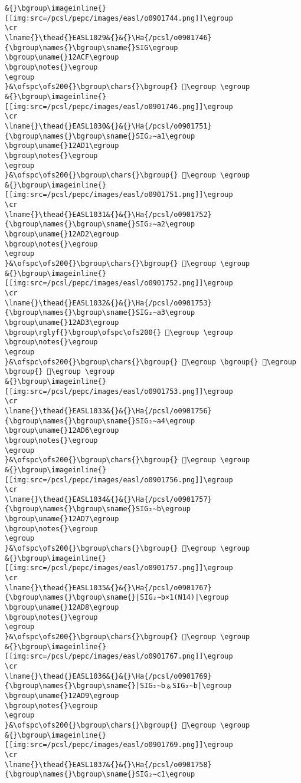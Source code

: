 \begin{verbatim}
&{}\bgroup\imageinline{}[[img:src=/pcsl/pepc/images/easl/o0901744.png]]\egroup
\cr
\lname{}\thead{}EASL1029&{}&{}\Ha{/pcsl/o0901746}{\bgroup\names{}\bgroup\sname{}SIG\egroup
\bgroup\uname{}12ACF\egroup
\bgroup\notes{}\egroup
\egroup
}&\ofspc\ofs200{}\bgroup\chars{}\bgroup{} 𒫏\egroup \egroup
&{}\bgroup\imageinline{}[[img:src=/pcsl/pepc/images/easl/o0901746.png]]\egroup
\cr
\lname{}\thead{}EASL1030&{}&{}\Ha{/pcsl/o0901751}{\bgroup\names{}\bgroup\sname{}SIG₂∼a1\egroup
\bgroup\uname{}12AD1\egroup
\bgroup\notes{}\egroup
\egroup
}&\ofspc\ofs200{}\bgroup\chars{}\bgroup{} 𒫑\egroup \egroup
&{}\bgroup\imageinline{}[[img:src=/pcsl/pepc/images/easl/o0901751.png]]\egroup
\cr
\lname{}\thead{}EASL1031&{}&{}\Ha{/pcsl/o0901752}{\bgroup\names{}\bgroup\sname{}SIG₂∼a2\egroup
\bgroup\uname{}12AD2\egroup
\bgroup\notes{}\egroup
\egroup
}&\ofspc\ofs200{}\bgroup\chars{}\bgroup{} 𒫒\egroup \egroup
&{}\bgroup\imageinline{}[[img:src=/pcsl/pepc/images/easl/o0901752.png]]\egroup
\cr
\lname{}\thead{}EASL1032&{}&{}\Ha{/pcsl/o0901753}{\bgroup\names{}\bgroup\sname{}SIG₂∼a3\egroup
\bgroup\uname{}12AD3\egroup
\bgroup\rglyf{}\bgroup\ofspc\ofs200{} 𒫓\egroup \egroup
\bgroup\notes{}\egroup
\egroup
}&\ofspc\ofs200{}\bgroup\chars{}\bgroup{} 𒫓\egroup \bgroup{} 𒫔\egroup \bgroup{} 𒫕\egroup \egroup
&{}\bgroup\imageinline{}[[img:src=/pcsl/pepc/images/easl/o0901753.png]]\egroup
\cr
\lname{}\thead{}EASL1033&{}&{}\Ha{/pcsl/o0901756}{\bgroup\names{}\bgroup\sname{}SIG₂∼a4\egroup
\bgroup\uname{}12AD6\egroup
\bgroup\notes{}\egroup
\egroup
}&\ofspc\ofs200{}\bgroup\chars{}\bgroup{} 𒫖\egroup \egroup
&{}\bgroup\imageinline{}[[img:src=/pcsl/pepc/images/easl/o0901756.png]]\egroup
\cr
\lname{}\thead{}EASL1034&{}&{}\Ha{/pcsl/o0901757}{\bgroup\names{}\bgroup\sname{}SIG₂∼b\egroup
\bgroup\uname{}12AD7\egroup
\bgroup\notes{}\egroup
\egroup
}&\ofspc\ofs200{}\bgroup\chars{}\bgroup{} 𒫗\egroup \egroup
&{}\bgroup\imageinline{}[[img:src=/pcsl/pepc/images/easl/o0901757.png]]\egroup
\cr
\lname{}\thead{}EASL1035&{}&{}\Ha{/pcsl/o0901767}{\bgroup\names{}\bgroup\sname{}|SIG₂∼b×1(N14)|\egroup
\bgroup\uname{}12AD8\egroup
\bgroup\notes{}\egroup
\egroup
}&\ofspc\ofs200{}\bgroup\chars{}\bgroup{} 𒫘\egroup \egroup
&{}\bgroup\imageinline{}[[img:src=/pcsl/pepc/images/easl/o0901767.png]]\egroup
\cr
\lname{}\thead{}EASL1036&{}&{}\Ha{/pcsl/o0901769}{\bgroup\names{}\bgroup\sname{}|SIG₂∼b﹠SIG₂∼b|\egroup
\bgroup\uname{}12AD9\egroup
\bgroup\notes{}\egroup
\egroup
}&\ofspc\ofs200{}\bgroup\chars{}\bgroup{} 𒫙\egroup \egroup
&{}\bgroup\imageinline{}[[img:src=/pcsl/pepc/images/easl/o0901769.png]]\egroup
\cr
\lname{}\thead{}EASL1037&{}&{}\Ha{/pcsl/o0901758}{\bgroup\names{}\bgroup\sname{}SIG₂∼c1\egroup

\end{verbatim}
